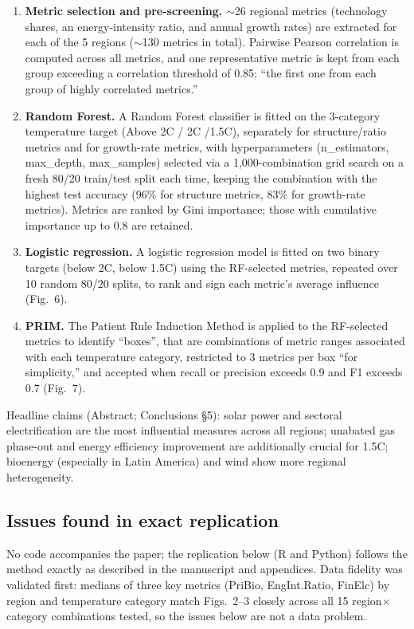 \documentclass[sn-basic]{sn-jnl}%
\begin{document}
\begin{enumerate}
	\item \textbf{Metric selection and pre-screening.} $\sim$26 regional metrics (technology shares, an energy-intensity ratio, and annual growth rates) are extracted for each of the 5 regions ($\sim$130 metrics in total). Pairwise Pearson correlation is computed across all metrics, and one representative metric is kept from each group exceeding a correlation threshold of 0.85: ``the first one from each group of highly correlated metrics.''
	\item \textbf{Random Forest.} A Random Forest classifier is fitted on the 3-category temperature target (Above 2\textdegree C / 2\textdegree C /1.5\textdegree C), separately for structure/ratio metrics and for growth-rate metrics, with hyperparameters (n\_estimators, max\_depth, max\_samples) selected via a 1,000-combination grid search on a fresh 80/20 train/test split each time, keeping the combination with the highest test
	accuracy (96\% for structure metrics, 83\% for growth-rate metrics). Metrics are ranked by Gini importance; those with cumulative importance up
	to 0.8 are retained.
	\item \textbf{Logistic regression.} A logistic regression model is fitted on two binary targets (below 2\textdegree C, below 1.5\textdegree C) using
	the RF-selected metrics, repeated over 10 random 80/20 splits, to rank and sign each metric's average influence (Fig.~6).
	\item \textbf{PRIM.} The Patient Rule Induction Method is applied to the RF-selected metrics to identify ``boxes'', that are combinations of metric ranges  associated with each temperature category, restricted to 3 metrics per	box ``for simplicity,'' and accepted when recall or precision exceeds 0.9
	and F1 exceeds 0.7 (Fig.~7).
\end{enumerate}

Headline claims (Abstract; Conclusions \S5): solar power and sectoral electrification are the most influential measures across all regions; unabated gas phase-out and energy efficiency improvement are additionally crucial for 1.5\textdegree C; bioenergy (especially in Latin America) and wind show more regional heterogeneity.

\subsection{Issues found in exact replication}

No code accompanies the paper; the replication below (R and Python) follows the method exactly as described in the manuscript and appendices. Data fidelity was validated first: medians of three key metrics (PriBio, EngInt.Ratio, FinElc) by region and temperature category match Figs.~2--3 closely across all 15 region$\times$category combinations tested, so the issues below are not a data problem.
\end{document}
